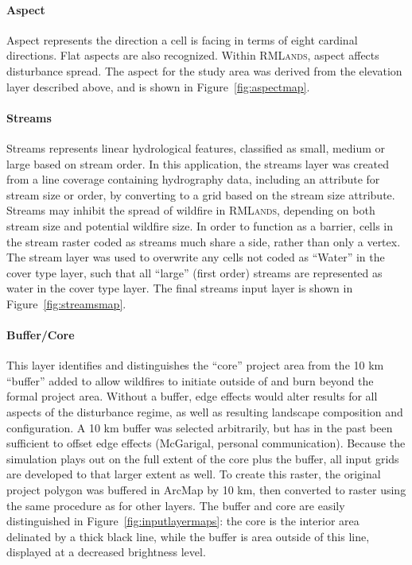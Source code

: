 \paragraph{Aspect} Aspect represents the direction a cell is facing in terms of eight cardinal directions. Flat aspects are also recognized. Within \textsc{RMLands}, aspect affects disturbance spread. The aspect for the study area was derived from the elevation layer described above, and is shown in Figure~\ref{fig:aspectmap}. 


\paragraph{Streams} 
Streams represents linear hydrological features, classified as small, medium or large based on stream order. In this application, the streams layer was created from a line coverage containing hydrography data, including an attribute for stream size or order, by converting to a grid based on the stream size attribute. Streams may inhibit the spread of wildfire in \textsc{RMLands}, depending on both stream size and potential wildfire size. In order to function as a barrier, cells in the stream raster coded as streams much share a side, rather than only a vertex. The stream layer was used to overwrite any cells not coded as ``Water'' in the cover type layer, such that all ``large'' (first order) streams are represented as water in the cover type layer. The final streams input layer is shown in Figure~\ref{fig:streamsmap}.


\paragraph{Buffer/Core} 
This layer identifies and distinguishes the ``core'' project area from the 10 km ``buffer'' added to allow wildfires to initiate outside of and burn beyond the formal project area. Without a buffer, edge effects would alter results for all aspects of the disturbance regime, as well as resulting landscape composition and configuration. A 10 km buffer was selected arbitrarily, but has in the past been sufficient to offset edge effects (McGarigal, personal communication). Because the simulation plays out on the full extent of the core plus the buffer, all input grids are developed to that larger extent as well. To create this raster, the original project polygon was buffered in ArcMap by 10 km, then converted to raster using the same procedure as for other layers. The buffer and core are easily distinguished in Figure~\ref{fig:inputlayermaps}: the core is the interior area delinated by a thick black line, while the buffer is area outside of this line, displayed at a decreased brightness level.



